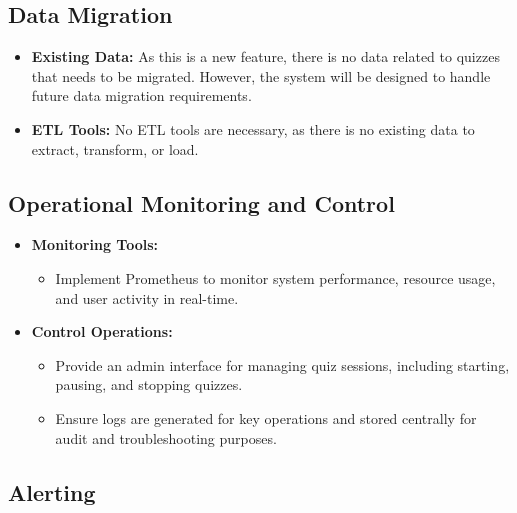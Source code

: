 \subsection{Data Migration}

\begin{itemize}
    \item \textbf{Existing Data:}
          As this is a new feature, there is no data related to quizzes that needs to be migrated. However, the system will be designed to handle future data migration requirements.
    \item \textbf{ETL Tools:}
          No ETL tools are necessary, as there is no existing data to extract, transform, or load.
\end{itemize}


\subsection{Operational Monitoring and Control}

\begin{itemize}
    \item \textbf{Monitoring Tools:}
          \begin{itemize}
              \item Implement Prometheus to monitor system performance, resource usage, and user activity in real-time.
          \end{itemize}
    \item \textbf{Control Operations:}
          \begin{itemize}
              \item Provide an admin interface for managing quiz sessions, including starting, pausing, and stopping quizzes.
              \item Ensure logs are generated for key operations and stored centrally for audit and troubleshooting purposes.
          \end{itemize}
\end{itemize}


\subsection{Alerting}

